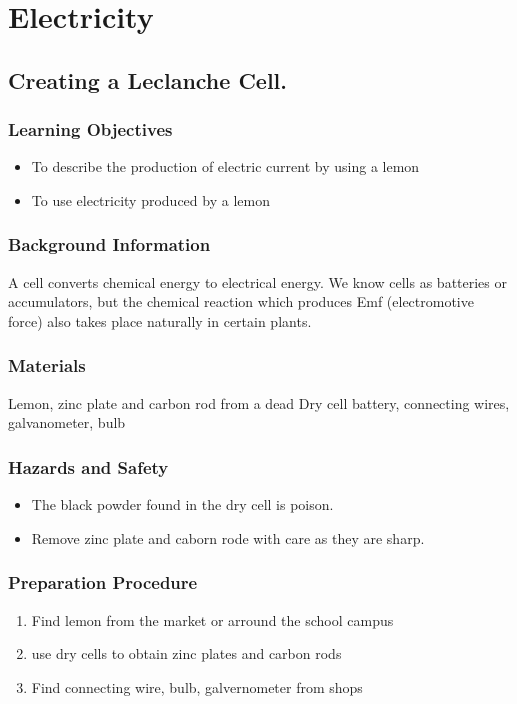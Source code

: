 \section{Electricity}

\subsection{Creating a Leclanche Cell.}

\subsubsection*{Learning Objectives}
\begin{itemize}
\item{To describe the production of electric current by using a lemon}
\item{To use electricity produced by a lemon}
\end{itemize}

\subsubsection*{Background Information}
A cell converts chemical energy to electrical energy.  We know cells as batteries or accumulators, but the chemical reaction which produces Emf (electromotive force) also takes place naturally in certain plants.

\subsubsection*{Materials}
Lemon, zinc plate and carbon rod from a dead Dry cell battery, connecting wires, galvanometer, bulb

\subsubsection*{Hazards and Safety}
\begin{itemize}
\item{The black powder found in the dry cell is poison.}
\item{Remove zinc plate and caborn rode with care as they are sharp.}
\end{itemize}

\subsubsection*{Preparation Procedure}
\begin{enumerate}
\item{Find lemon from the market or arround the school campus}
\item{use dry cells to obtain zinc plates and carbon rods}
\item{Find connecting wire, bulb, galvernometer from shops}
\end{enumerate}

